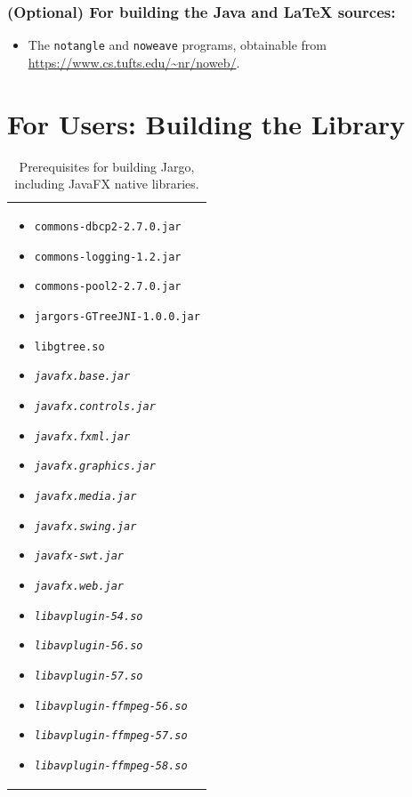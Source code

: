 \subsubsection*{(Optional) For building the Java and LaTeX sources:}
\begin{itemize}
\item The \texttt{notangle} and \texttt{noweave} programs, obtainable from
\url{https://www.cs.tufts.edu/~nr/noweb/}.
\end{itemize}

\section{For Users: Building the Library}

\begin{table}
\small
\centering
\caption{Prerequisites for building Jargo, including JavaFX native libraries.}
\label{tab:prereqs}
\begin{tabular}{|p{}|}
\hline
\begin{itemize}
\item \texttt{commons-dbcp2-2.7.0.jar}
\item \texttt{commons-logging-1.2.jar}
\item \texttt{commons-pool2-2.7.0.jar}
\item \texttt{jargors-GTreeJNI-1.0.0.jar}
\item \texttt{libgtree.so}
\item \textit{\texttt{javafx.base.jar}}
\item \textit{\texttt{javafx.controls.jar}}
\item \textit{\texttt{javafx.fxml.jar}}
\item \textit{\texttt{javafx.graphics.jar}}
\item \textit{\texttt{javafx.media.jar}}
\item \textit{\texttt{javafx.swing.jar}}
\item \textit{\texttt{javafx-swt.jar}}
\item \textit{\texttt{javafx.web.jar}}
\item \textit{\texttt{libavplugin-54.so}}
\item \textit{\texttt{libavplugin-56.so}}
\item \textit{\texttt{libavplugin-57.so}}
\item \textit{\texttt{libavplugin-ffmpeg-56.so}}
\item \textit{\texttt{libavplugin-ffmpeg-57.so}}
\item \textit{\texttt{libavplugin-ffmpeg-58.so}}

\end{itemize}
\end{tabular}
\end{table}
